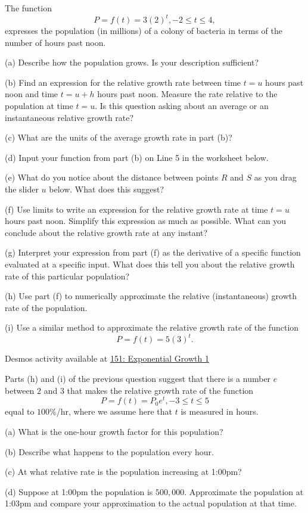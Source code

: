 \documentclass{ximera}
\begin{document}
\begin{question}  \label{Qdrg5h888}
The function 
\[
        P = f(t) = 3(2)^t , -2\leq t \leq 4 ,
\] 
expresses the population (in millions) of a colony of bacteria in terms of the number of hours past noon.

(a) Describe how the population grows. Is your description sufficient?

(b) Find an expression for the relative growth rate between time $t=u$ hours past noon and time $t=u+h$ hours past noon. Measure the rate relative to the population at time $t=u$. Is this question asking about an average or an instantaneous relative growth rate?

(c) What are the units of the average growth rate in part (b)?

(d) Input your function from part (b) on Line 5 in the worksheet below. 

(e) What do you notice about the distance between points $R$ and $S$ as you drag the slider $u$ below. What does this suggest?

(f) Use limits to write an expression for the relative growth rate at time $t=u$ hours past noon. Simplify this expression as much as possible.  What can you conclude about the relative growth rate at any instant?

(g) Interpret your expression from part (f) as the derivative of a specific function evaluated at a specific input. What does this tell you about the relative growth rate of this particular population?

(h) Use part (f) to numerically approximate the relative (instantaneous) growth rate of the population.

(i) Use a similar method to approximate the relative growth rate of the function 
\[
   P = f(t) = 5 (3)^t .
\]



\begin{onlineOnly}
    \begin{center}
\end{center}
\end{onlineOnly}


Desmos activity available at \href{https://www.desmos.com/calculator/omjbec2hpu}{151: Exponential Growth 1}
\end{question}


\begin{question}  \label{Qcgbt4tt}
Parts (h) and (i) of the previous question suggest that there is a number $e$ between $2$ and $3$ that makes the 
relative growth rate of the function 
\[
         P = f(t) = P_0 e^t , -3\leq t \leq 5
\]
equal to $100\%$/hr, where we assume here that $t$ is measured in hours. 

(a) What is the one-hour growth factor for this population?

(b) Describe what happens to the population every hour.

(c) At what relative rate is the population increasing at 1:00pm?

(d) Suppose at 1:00pm the population is $500,000$. Approximate the population at 1:03pm and compare your approximation to the actual population at that time.
\end{question}
\end{document}
